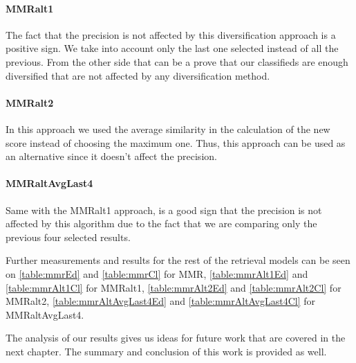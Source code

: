  \paragraph{MMRalt1}

The fact that the precision is not affected by this diversification approach is a positive sign. We take into account only the last one selected instead of all the previous. From the other side that can be a prove that our classifieds are enough diversified that are not affected by any diversification method.


 \paragraph{MMRalt2}

In this approach we used the average similarity in the calculation of the new score instead of choosing the maximum one. Thus, this approach can be used as an alternative since it doesn't affect the precision.


 \paragraph{MMRaltAvgLast4}

 Same with the MMRalt1 approach, is a good sign that the precision is not affected by this algorithm due to the fact that we are comparing only the previous four selected results.


Further measurements and results for the rest of the retrieval models can be seen on \ref{table:mmrEd} and \ref{table:mmrCl} for MMR, \ref{table:mmrAlt1Ed} and \ref{table:mmrAlt1Cl} for MMRalt1, \ref{table:mmrAlt2Ed} and \ref{table:mmrAlt2Cl} for MMRalt2,  \ref{table:mmrAltAvgLast4Ed} and \ref{table:mmrAltAvgLast4Cl} for MMRaltAvgLast4.


The analysis of our results gives us ideas for future work that are covered in the next chapter. The summary and conclusion of this work is provided as well.